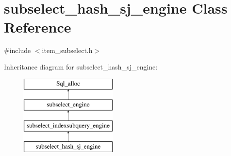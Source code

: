 \hypertarget{classsubselect__hash__sj__engine}{}\section{subselect\+\_\+hash\+\_\+sj\+\_\+engine Class Reference}
\label{classsubselect__hash__sj__engine}


{\ttfamily \#include $<$item\+\_\+subselect.\+h$>$}

Inheritance diagram for subselect\+\_\+hash\+\_\+sj\+\_\+engine\+:\begin{figure}[H]
\begin{center}
\leavevmode
\includegraphics[height=4.000000cm]{classsubselect__hash__sj__engine}
\end{center}
\end{figure}
